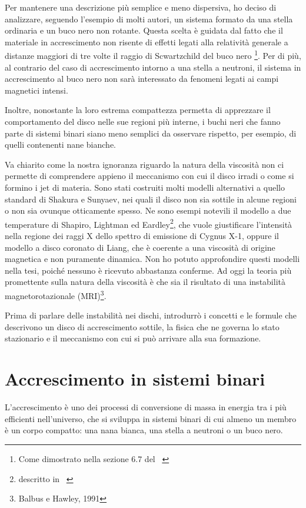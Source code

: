 \documentclass[a4paperbi]{article}
\begin{document}
	Per mantenere una descrizione più semplice e meno dispersiva, ho deciso di analizzare, seguendo l'esempio di molti autori, un sistema formato da una stella ordinaria e un buco nero non rotante. Questa scelta è guidata dal fatto che il materiale in accrescimento non risente di effetti legati alla relatività generale a distanze maggiori di tre volte il raggio di Scwartzchild del buco nero
\footnote{Come dimostrato nella sezione 6.7 del ~\cite{FrankKingRaineAccretionPower}}. Per di più, al contrario del caso di accrescimento intorno a una stella a neutroni, il sistema in accrescimento al buco nero non sarà interessato da fenomeni legati ai campi magnetici intensi.

	Inoltre, nonostante la loro estrema compattezza permetta di apprezzare il comportamento del disco nelle sue regioni più interne, i buchi neri che fanno parte di sistemi binari siano meno semplici da osservare rispetto, per esempio, di quelli contenenti nane bianche.

	Va chiarito come la nostra ignoranza riguardo la natura della viscosità non ci permette di comprendere appieno il meccanismo con cui il disco irradi o come si formino i jet di materia. Sono stati costruiti molti modelli alternativi a quello standard di Shakura e Sunyaev, nei quali il disco non sia sottile in alcune regioni o non sia ovunque otticamente spesso. Ne sono esempi notevili il modello a due temperature di Shapiro, Lightman ed Eardley\footnote{descritto in ~\cite{ShapiroLightmanEardley1976}}, che vuole giustificare l'intensità nella regione dei raggi X dello spettro di emissione di Cygnus X-1, oppure il modello a disco coronato di Liang, che è coerente a una viscosità di origine magnetica e non puramente dinamica. Non ho potuto approfondire questi modelli nella tesi, poiché nessuno è ricevuto abbastanza conferme. Ad oggi la teoria più promettente sulla natura della viscosità è che sia il risultato di una instabilità magnetorotazionale (MRI)\footnote{Balbus e Hawley, 1991}.

	Prima di parlare delle instabilità nei dischi, introdurrò i concetti e le formule che descrivono un disco di accrescimento sottile, la fisica che ne governa lo stato stazionario e il meccanismo con cui si può arrivare alla sua formazione.
	
\newpage
\section{Accrescimento in sistemi binari}
	L'accrescimento è uno dei processi di conversione di massa in energia tra i più efficienti nell'universo, che si sviluppa in sistemi binari di cui almeno un membro è un corpo compatto: una nana bianca, una stella a neutroni o un buco nero.
\end{document}
